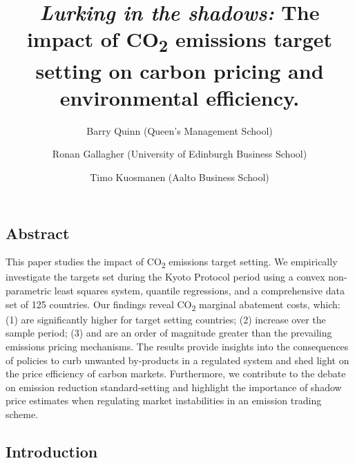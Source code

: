 \documentclass[
]{article}\usepackage{amsmath,amssymb}
\title{\emph{Lurking in the shadows:} The impact of CO\textsubscript{2}
emissions target setting on carbon pricing and environmental
efficiency.}
\author{Barry Quinn (Queen's Management School) \and Ronan Gallagher
(University of Edinburgh Business School) \and Timo Kuosmanen (Aalto
Business School)}
\date{}
\begin{document}
\maketitle

\ifdefined\Shaded\renewenvironment{Shaded}{\begin{tcolorbox}[enhanced, interior hidden, breakable, boxrule=0pt, sharp corners, borderline west={3pt}{0pt}{shadecolor}, frame hidden]}{\end{tcolorbox}}\fi

\hypertarget{abstract}{%
\subsection{Abstract}\label{abstract}}

This paper studies the impact of CO\textsubscript{2} emissions target
setting. We empirically investigate the targets set during the Kyoto
Protocol period using a convex non-parametric least squares system,
quantile regressions, and a comprehensive data set of 125 countries. Our
findings reveal CO\textsubscript{2} marginal abatement costs, which: (1)
are significantly higher for target setting countries; (2) increase over
the sample period; (3) and are an order of magnitude greater than the
prevailing emissions pricing mechanisms. The results provide insights
into the consequences of policies to curb unwanted by-products in a
regulated system and shed light on the price efficiency of carbon
markets. Furthermore, we contribute to the debate on emission reduction
standard-setting and highlight the importance of shadow price estimates
when regulating market instabilities in an emission trading scheme.

\newpage

\hypertarget{introduction}{%
\subsection{Introduction}\label{introduction}}
\end{document}
